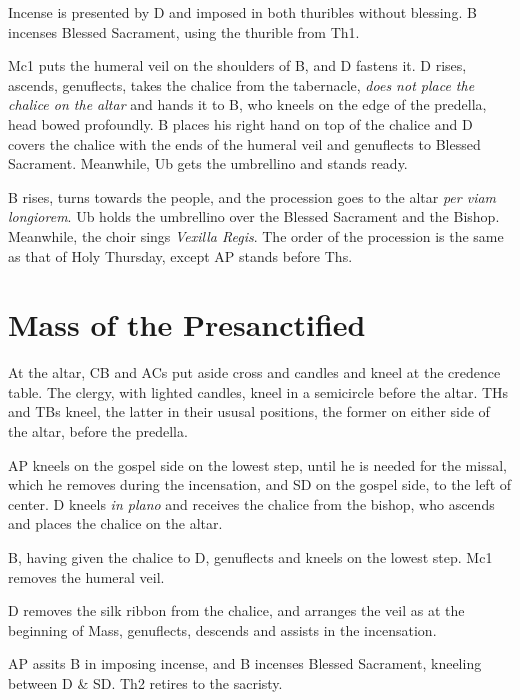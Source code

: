 {    \rubric Incense is presented by D and imposed in both thuribles without
    blessing. B incenses Blessed Sacrament, using the thurible from Th1.

    \rubric Mc1 puts the humeral veil on the shoulders of B, and D fastens it.
    D rises, ascends, genuflects, takes the chalice from the tabernacle,
    \textit{does not place the chalice on the altar} and hands it to B, who
    kneels on the edge of the predella, head bowed profoundly. B places his
    right hand on top of the chalice and D covers the chalice with the ends of
    the humeral veil and genuflects to Blessed Sacrament. Meanwhile, Ub gets
    the umbrellino and stands ready.

    \rubric B rises, turns towards the people, and the procession goes to the
    altar \textit{per viam longiorem}. Ub holds the umbrellino over the Blessed
    Sacrament and the Bishop. Meanwhile, the choir sings \textit{Vexilla
    Regis}. The order of the procession is the same as that of Holy Thursday,
    except AP stands before Ths.

\section{Mass of the Presanctified}

    \rubric At the altar, CB and ACs put aside cross and candles and kneel at
    the credence table. The clergy, with lighted candles, kneel in a semicircle
    before the altar. THs and TBs kneel, the latter in their ususal positions,
    the former on either side of the altar, before the predella.

    \rubric AP kneels on the gospel side on the lowest step, until he is needed
    for the missal, which he removes during the incensation, and SD on the
    gospel side, to the left of center. D kneels \textit{in plano} and receives
    the chalice from the bishop, who ascends and places the chalice on the
    altar.

    \rubric B, having given the chalice to D, genuflects and kneels on the
    lowest step. Mc1 removes the humeral veil.

    \rubric D removes the silk ribbon from the chalice, and arranges the veil
    as at the beginning of Mass, genuflects, descends and assists in the
    incensation.

    \rubric AP assits B in imposing incense, and B incenses Blessed Sacrament,
    kneeling between D \& SD. Th2 retires to the sacristy.

}
